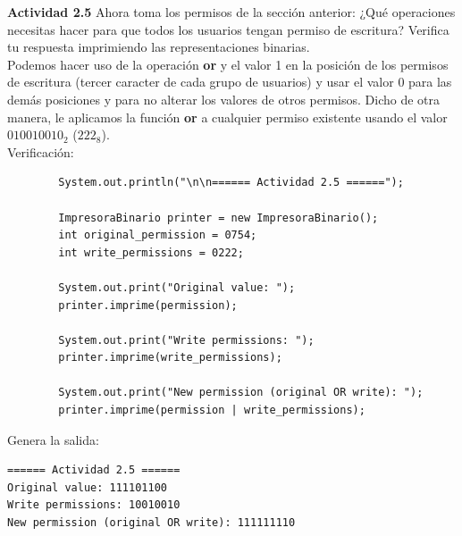 \documentclass[11pt,letterpaper]{article}
\begin{document}
\textbf{Actividad 2.5} Ahora toma los permisos de la sección anterior: ¿Qué
operaciones necesitas hacer para que todos los usuarios tengan permiso de
escritura? Verifica tu respuesta imprimiendo las representaciones binarias. \\

    Podemos hacer uso de la operación \textbf{or} y el valor 1 en la posición
    de los permisos de escritura (tercer caracter de cada grupo de usuarios)
    y usar el valor 0 para las demás posiciones y para no alterar los valores
    de otros permisos. Dicho de otra manera, le aplicamos la función \textbf{or}
    a cualquier permiso existente usando el valor \textbf{$010010010_2$} ($222_8$). \\

    \clearpage
    Verificación:

    \begin{verbatim}
        System.out.println("\n\n====== Actividad 2.5 ======");

        ImpresoraBinario printer = new ImpresoraBinario();
        int original_permission = 0754;
        int write_permissions = 0222;

        System.out.print("Original value: ");
        printer.imprime(permission);

        System.out.print("Write permissions: ");
        printer.imprime(write_permissions);

        System.out.print("New permission (original OR write): ");
        printer.imprime(permission | write_permissions);
    \end{verbatim}

    Genera la salida:
    \begin{verbatim}
====== Actividad 2.5 ======
Original value: 111101100
Write permissions: 10010010
New permission (original OR write): 111111110
    \end{verbatim}
\end{document}
